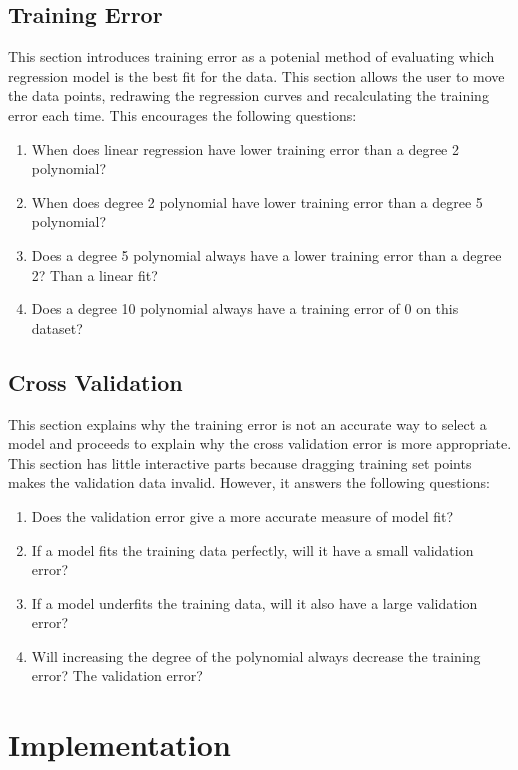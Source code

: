 \documentclass{acm_proc_article-sp}
\begin{document}
\subsection{Training Error}

This section introduces training error as a potenial method of evaluating
which regression model is the best fit for the data. This section allows the
user to move the data points, redrawing the regression curves and recalculating
the training error each time. This encourages the following questions:

\begin{enumerate}
  \item When does linear regression have lower training error than a degree 2
  polynomial?
  \item When does degree 2 polynomial have lower training error than a degree 5
  polynomial?
  \item Does a degree 5 polynomial always have a lower training error than a
  degree 2? Than a linear fit?
  \item Does a degree 10 polynomial always have a training error of 0 on this
  dataset?
\end{enumerate}

\subsection{Cross Validation}

This section explains why the training error is not an accurate way to select a
model and proceeds to explain why the cross validation error is more
appropriate. This section has little interactive parts because dragging
training set points makes the validation data invalid. However, it answers the
following questions:

\begin{enumerate}
  \item Does the validation error give a more accurate measure of model fit?
  \item If a model fits the training data perfectly, will it have a small
  validation error?
  \item If a model underfits the training data, will it also have a large
  validation error?
  \item Will increasing the degree of the polynomial always decrease the
  training error? The validation error?
\end{enumerate}

\section{Implementation}
\end{document}
